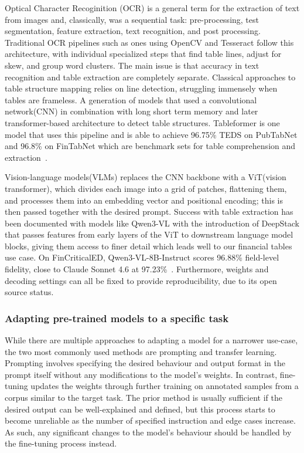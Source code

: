 \documentclass[ %
                    author={Natchalin Iwsakul \\ Inkaphol Siriwongwattana \\ Tanaphan Kummaraphat \\ Patorn Srisupap},
                supervisor={Fernando Moreno-Pino},
                    degree={MSc},
                     title={Propensity Modelling for SME Commercial Lending Using Open Public Data},
                  subtitle={Companies House filings and GDELT media coverage as predictors of first-time borrowing},
                      type={},
                      year={2026}]{dissertation}
\begin{document}
Optical Character Recoginition (OCR) is a general term for the extraction of text from images and, classically, was a sequential task: pre-processing, test segmentation, feature extraction, text recognition, and post processing. Traditional OCR pipelines such as ones using OpenCV and Tesseract\cite{tesseract_ocr}\cite{open_cv_and_tesseract} follow this architecture, with individual specialized steps that find table lines, adjust for skew, and group word clusters. The main issue is that accuracy in text recognition and table extraction are completely separate. Classical approaches to table structure mapping relies on line detection, struggling immensely when tables are frameless\cite{open_cv_and_tesseract}. A generation of models that used a convolutional network(CNN) in combination with long short term memory and later transformer-based architecture to detect table structures. Tableformer is one model that uses this pipeline and is able to achieve 96.75\% TEDS on PubTabNet and 96.8\% on FinTabNet which are benchmark sets for table comprehension and extraction~\cite{}.

Vision-language models(VLMs) replaces the CNN backbone with a ViT(vision transformer)\cite{dosovitskiy2021vit}, which divides each image into a grid of patches, flattening them, and processes them into an embedding vector and positional encoding; this is then passed together with the desired prompt. Success with table extraction has been documented with models like Qwen3-VL with the introduction of DeepStack that passes features from early layers of the ViT to downstream language model blocks, giving them access to finer detail which leads well to our financial tables use case. On FinCriticalED, Qwen3-VL-8B-Instruct scores 96.88\% field-level fidelity, close to Claude Sonnet 4.6 at 97.23\%~\cite{he2025fincriticaled}. Furthermore, weights and decoding settings can all be fixed to provide reproducibility, due to its open source status.

\subsubsection{Adapting pre-trained models to a specific task}
While there are multiple approaches to adapting a model for a narrower use-case, the two most commonly used methods are prompting and transfer learning. Prompting involves specifying the desired behaviour and output format in the prompt itself without any modifications to the model's weights. In contrast, fine-tuning updates the weights through further training on annotated samples from a corpus similar to the target task. The prior method is usually sufficient if the desired output can be well-explained and defined, but this process starts to become unreliable as the number of specified instruction and edge cases increase. As such, any significant changes to the model's behaviour should be handled by the fine-tuning process instead.
\end{document}
